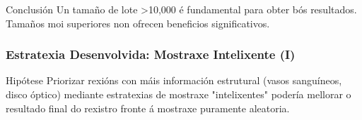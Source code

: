 \documentclass[xcolor=dvipsnames]{beamer}
\begin{document}
\begin{frame}
    \begin{alertblock}{Conclusión}
        Un tamaño de lote >10,000 é fundamental para obter bós resultados. Tamaños moi superiores non ofrecen beneficios significativos.
    \end{alertblock}
    
\end{frame}
\begin{frame}
    \frametitle{Estratexia Desenvolvida: Mostraxe Intelixente (I)}

    \begin{block}{Hipótese}
        Priorizar rexións con máis información estrutural (vasos sanguíneos, disco óptico) mediante estratexias de mostraxe "intelixentes" podería mellorar o resultado final do rexistro fronte á mostraxe puramente aleatoria.
    \end{block}

    \vspace{0cm}


\end{frame}
\end{document}
